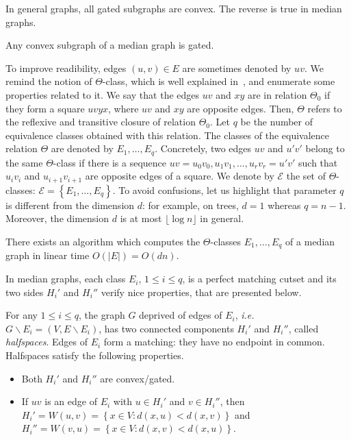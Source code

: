 \documentclass[a4paper,UKenglish,numberwithinsect,cleveref, autoref]{lipics-v2021}
\newcommand{\set}[1]{\left\{ #1 \right\}}
\newcommand{\card}[1]{\left| #1 \right|}
\begin{document}
In general graphs, all gated subgraphs are convex. The reverse is true in median graphs.
\begin{lemma}
Any convex subgraph of a median graph is gated.
\end{lemma}

To improve readibility, edges $(u,v) \in E$ are sometimes denoted by $uv$. We remind the notion of $\Theta$-class, which is well explained in~\cite{BeChChVa20}, and enumerate some properties related to it. We say that the edges $uv$ and $xy$ are in relation $\Theta_0$ if they form a square $uvyx$, where $uv$ and $xy$ are opposite edges. Then, $\Theta$ refers to the reflexive and transitive closure of relation $\Theta_0$. Let $q$ be the number of equivalence classes obtained with this relation. The classes of the equivalence relation $\Theta$ are denoted by $E_1,\ldots,E_q$. Concretely, two edges $uv$ and $u'v'$ belong to the same $\Theta$-class if there is a sequence $uv = u_0v_0, u_1v_1, \ldots, u_rv_r= u'v'$ such that $u_iv_i$ and $u_{i+1}v_{i+1}$ are opposite edges of a square. We denote by $\mathcal{E}$ the set of $\Theta$-classes: $\mathcal{E} = \set{E_1,\ldots,E_q}$. To avoid confusions, let us highlight that parameter $q$ is different from the dimension $d$: for example, on trees, $d=1$ whereas $q = n-1$. Moreover, the dimension $d$ is at most $\lfloor \log n \rfloor$ in general.

\begin{lemma}
There exists an algorithm which computes the $\Theta$-classes $E_1,\ldots,E_q$ of a median graph in linear time $O(\card{E}) = O(dn)$.
\label{le:linear_classes}
\end{lemma}

In median graphs, each class $E_i$, $1\le i\le q$, is a perfect matching cutset and its two sides $H_i'$ and $H_i''$ verify nice properties, that are presented below.

\begin{lemma}
For any $1\le i\le q$, the graph $G$ deprived of edges of $E_i$, {\em i.e.} $G\backslash E_i = (V,E\backslash E_i)$, has two connected components $H_i'$ and $H_i''$, called \textit{halfspaces}. Edges of $E_i$ form a matching: they have no endpoint in common. Halfspaces satisfy the following properties.
\begin{itemize}
\item Both $H_i'$ and $H_i''$ are convex/gated.
\item If $uv$ is an edge of $E_i$ with $u \in H_i'$ and $v \in H_i''$, then $H_i' = W(u,v) = \set{x \in V: d(x,u) < d(x,v)}$ and $H_i'' = W(v,u) = \set{x \in V: d(x,v) < d(x,u)}$.
\end{itemize}
\label{le:halfspaces}
\end{lemma}
\end{document}
